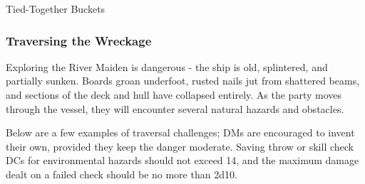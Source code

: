 \begin{DndTrap}[width=0.5\textwidth - 4pt]{Tied-Together Buckets}
\end{DndTrap}

\subsubsection*{Traversing the Wreckage}
{\entryfont\noindent Exploring the River Maiden is dangerous - the ship is old, splintered, and partially sunken. Boards groan underfoot, rusted nails jut from shattered beams, and sections of the deck and hull have collapsed entirely. As the party moves through the vessel, they will encounter several natural hazards and obstacles.

\noindent Below are a few examples of traversal challenges; DMs are encouraged to invent their own, provided they keep the danger moderate. Saving throw or skill check DCs for environmental hazards should not exceed 14, and the maximum damage dealt on a failed check should be no more than 2d10.}

